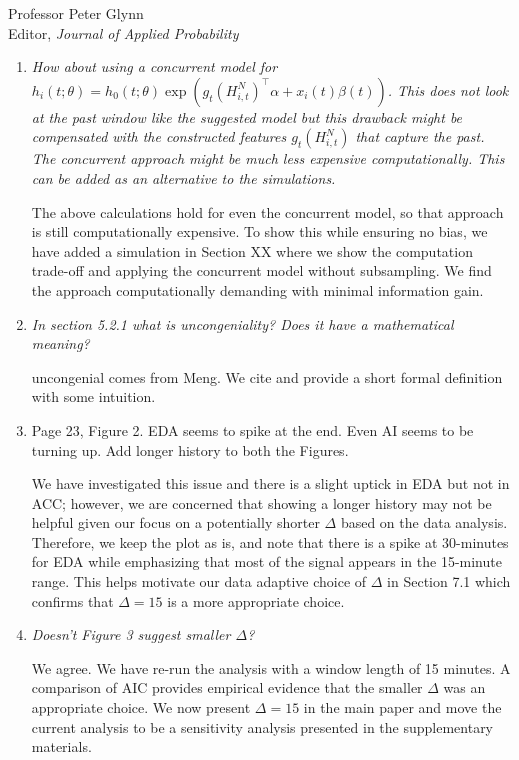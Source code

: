 \documentclass[11pt]{letter} %
\begin{document}
\begin{letter}{Professor
	Peter Glynn\\
	Editor, {\em Journal of Applied Probability}}
\begin{enumerate}
\vspace{5mm}

\item {\it How about using a concurrent model for $h_i (t;\theta) = h_0 (t; \theta) \exp (g_t (H_{i,t}^N)^\top \alpha + x_i (t) \beta (t))$. This does not look at the past window like the suggested model but this drawback might be compensated with the constructed features $g_t (H_{i,t}^N)$ that capture the past. The concurrent approach might be much less expensive computationally. This can be added as an alternative to the simulations.}

\vspace{5mm}
The above calculations hold for even the concurrent model, so that approach is still computationally expensive.  To show this while ensuring no bias, we have added a simulation in Section XX where we show the computation trade-off and applying the concurrent model without subsampling.  We find the approach computationally demanding with minimal information gain.
\vspace{5mm}

\item {\it In section 5.2.1 what is uncongeniality? Does it have a mathematical
meaning?}

\vspace{5mm}
uncongenial comes from Meng. We cite and provide a short formal definition with some intuition.
\vspace{5mm}

\item Page 23, Figure 2. EDA seems to spike at the end. Even AI seems to be
turning up. Add longer history to both the Figures.
\vspace{5mm}

We have investigated this issue and there is a slight uptick in EDA but not in ACC; however, we are concerned that showing a longer history may not be helpful given our focus on a potentially shorter $\Delta$ based on the data analysis.  Therefore, we keep the plot as is, and note that there is a spike at 30-minutes for EDA while emphasizing that most of the signal appears in the 15-minute range.  This helps motivate our data adaptive choice of $\Delta$ in Section 7.1 which confirms that $\Delta = 15$ is a more appropriate choice.
\vspace{5mm}


\item {\it Doesn’t Figure 3 suggest smaller $\Delta$?}

\vspace{5mm}
We agree.  We have re-run the analysis with a window length of 15 minutes.  A comparison of AIC provides empirical evidence that the smaller $\Delta$ was an appropriate choice.  We now present $\Delta = 15$ in the main paper and move the current analysis to be a sensitivity analysis presented in the supplementary materials.
\vspace{5mm}


\end{enumerate}
\end{letter}
\end{document}
